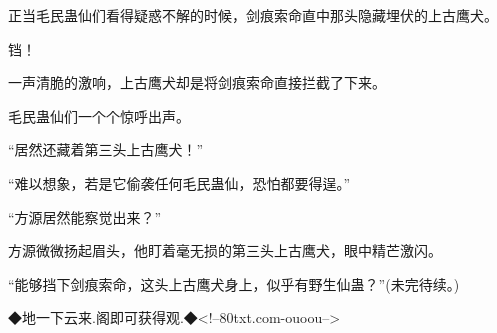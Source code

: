 \begin{this_body}
正当毛民蛊仙们看得疑惑不解的时候，剑痕索命直中那头隐藏埋伏的上古鹰犬。

铛！

一声清脆的激响，上古鹰犬却是将剑痕索命直接拦截了下来。

毛民蛊仙们一个个惊呼出声。

“居然还藏着第三头上古鹰犬！”

“难以想象，若是它偷袭任何毛民蛊仙，恐怕都要得逞。”

“方源居然能察觉出来？”

方源微微扬起眉头，他盯着毫无损的第三头上古鹰犬，眼中精芒激闪。

“能够挡下剑痕索命，这头上古鹰犬身上，似乎有野生仙蛊？”(未完待续。)

◆地一下云来.阁即可获得观.◆<!--80txt.com-ouoou-->

\end{this_body}

